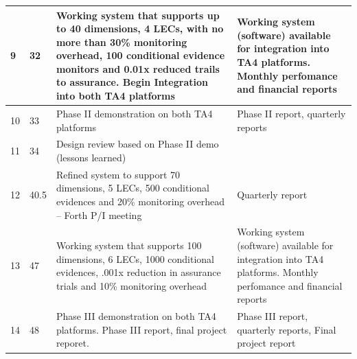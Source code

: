 \begin{table}[ht]
{\begin{tabular}{|m{.25in}|m{.25in}|m{4.0in}|m{1.65in}|}
9 & 32 & Working system that supports up to 40 dimensions, 4 LECs, with no more than 30\% monitoring overhead, 100 conditional evidence monitors and 0.01x reduced trails to assurance.  Begin Integration into both TA4 platforms & Working system (software) available for integration into TA4 platforms.  Monthly perfomance and financial reports \\ \hline
10 & 33 & Phase II demonstration on both TA4 platforms & Phase II report, quarterly reports \\ \hline
11 & 34 & Design review based on Phase II demo (lessons learned) &  \\ \hline
12 & 40.5 & Refined system to support 70 dimensions, 5 LECs, 500 conditional evidences and 20\% monitoring overhead – Forth P/I meeting & Quarterly report \\ \hline
13 & 47 & Working system that supports 100 dimensions, 6 LECs, 1000 conditional evidences, .001x reduction in assurance trials and 10\% monitoring overhead & Working system (software) available for integration into TA4 platforms.  Monthly perfomance and financial reports \\ \hline
14 & 48 & Phase III demonstration on both TA4 platforms. Phase III report, final project reporet. & Phase III report, quarterly reports, Final project report \\ \hline
\end{tabular}
}
\label{tab:milestones}
\end{table}

